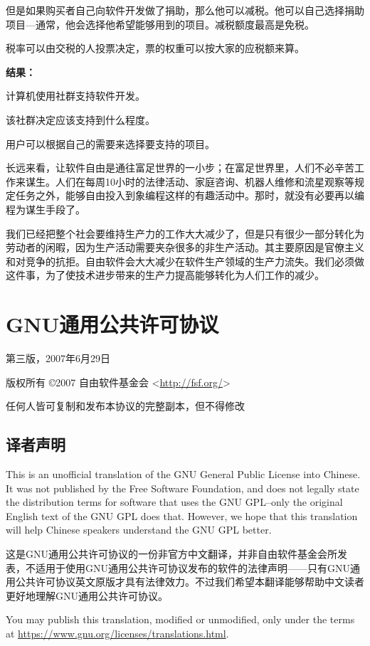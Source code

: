 但是如果购买者自己向软件开发做了捐助，那么他可以减税。他可以自己选择捐助项目—通常，他会选择他希望能够用到的项目。减税额度最高是免税。\par
税率可以由交税的人投票决定，票的权重可以按大家的应税额来算。\par
\bf 结果：\normalall\par
计算机使用社群支持软件开发。\par
该社群决定应该支持到什么程度。\par
用户可以根据自己的需要来选择要支持的项目。\par
长远来看，让软件自由是通往富足世界的一小步；在富足世界里，人们不必辛苦工作来谋生。人们在每周10小时的法律活动、家庭咨询、机器人维修和流星观察等规定任务之外，能够自由投入到象编程这样的有趣活动中。那时，就没有必要再以编程为谋生手段了。\par
我们已经把整个社会要维持生产力的工作大大减少了，但是只有很少一部分转化为劳动者的闲暇，因为生产活动需要夹杂很多的非生产活动。其主要原因是官僚主义和对竞争的抗拒。自由软件会大大减少在软件生产领域的生产力流失。我们必须做这件事，为了使技术进步带来的生产力提高能够转化为人们工作的减少。

\section{GNU通用公共许可协议}
\cite{gplzhs}\par
第三版，2007年6月29日\par
版权所有 \copyright 2007 自由软件基金会 <\url{http://fsf.org/}>\par
任何人皆可复制和发布本协议的完整副本，但不得修改\par
\subsection{译者声明}
This is an unofficial translation of the GNU General Public License into Chinese. It was not published by the Free Software Foundation, and does not legally state the distribution terms for software that uses the GNU GPL--only the original English text of the GNU GPL does that. However, we hope that this translation will help Chinese speakers understand the GNU GPL better.\par
这是GNU通用公共许可协议的一份非官方中文翻译，并非自由软件基金会所发表，不适用于使用GNU通用公共许可协议发布的软件的法律声明——只有GNU通用公共许可协议英文原版才具有法律效力。不过我们希望本翻译能够帮助中文读者更好地理解GNU通用公共许可协议。\par
You may publish this translation, modified or unmodified, only under the terms at \url{https://www.gnu.org/licenses/translations.html}.\par
